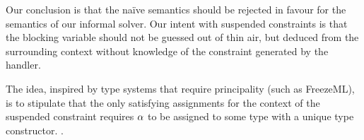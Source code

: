 \documentclass[acmsmall,screen,nonacm]{acmart}
\begin{document}
\begin{version}{}
Our conclusion is that the na\"ive semantics should be rejected in favour
for the semantics of our informal solver. Our intent with suspended
constraints is that the blocking variable should not be guessed out of thin
air, but deduced from the surrounding context without knowledge of the
constraint generated by the handler.

The idea, inspired by type systems that require principality (such as
FreezeML), is to stipulate that the only satisfying assignments for the
context of the suspended constraint requires $\alpha$ to be assigned to some
type with a unique type constructor.
.








\end{version}
\end{document}
